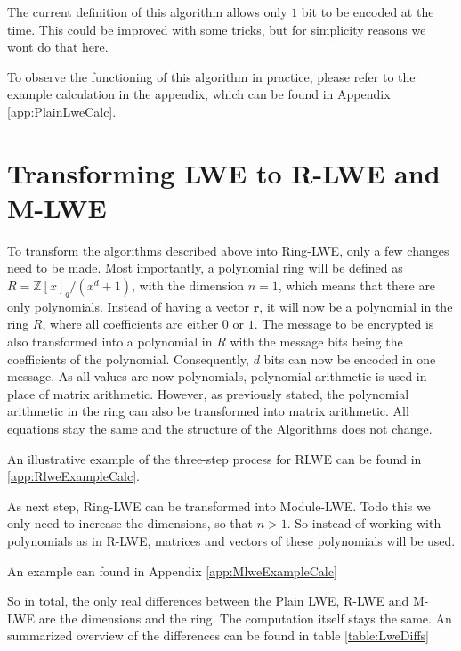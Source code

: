 
The current definition of this algorithm allows only $1$ bit to be encoded at the time. This could be improved with some tricks, but for simplicity reasons we wont do that here. 

To observe the functioning of this algorithm in practice, please refer to the example calculation in the appendix, which can be found in Appendix \ref{app:PlainLweCalc}.

\section{Transforming LWE to R-LWE and M-LWE}
\label{sec:TransformingLweToRlweAndMlwe}

To transform the algorithms described above into Ring-LWE, only a few changes need to be made. Most importantly, a polynomial ring will be defined as $R = \mathbb{Z}[x]_q/(x^d+1)$, with the dimension $n=1$, which means that there are only polynomials. Instead of having a vector $\textbf{r}$, it will now be a polynomial in the ring $R$, where all coefficients are either $0$ or $1$. The message to be encrypted is also transformed into a polynomial in $R$ with the message bits being the coefficients of the polynomial. Consequently, $d$ bits can now be encoded in one message. As all values are now polynomials, polynomial arithmetic is used in place of matrix arithmetic. However, as previously stated, the polynomial arithmetic in the ring can also be transformed into matrix arithmetic. All equations stay the same and the structure of the Algorithms does not change.

An illustrative example of the three-step process for RLWE can be found in \ref{app:RlweExampleCalc}.

As next step, Ring-LWE can be transformed into Module-LWE. Todo this we only need to increase the dimensions, so that $n>1$. So instead of working with polynomials as in R-LWE, matrices and vectors of these polynomials will be used.

An example can found in Appendix \ref{app:MlweExampleCalc}

So in total, the only real differences between the Plain LWE, R-LWE and M-LWE are the dimensions and the ring. The computation itself stays the same. An summarized overview of the differences can be found in table \ref{table:LweDiffs}

